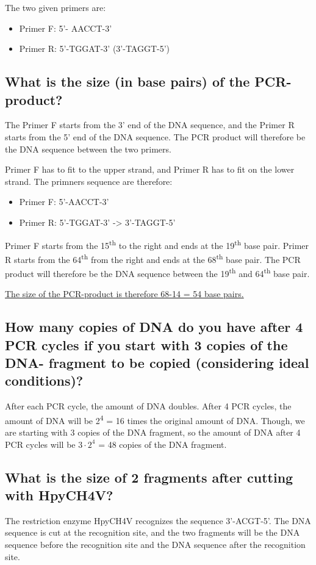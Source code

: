 The two given primers are:
\begin{itemize}
    \item Primer F: 5’- AACCT-3’
    \item Primer R: 5’-TGGAT-3’ (3'-TAGGT-5')
\end{itemize}

\subsection{What is the size (in base pairs) of the PCR-product?}
The Primer F starts from the 3' end of the DNA sequence, and the Primer R starts from the 5' end of the DNA sequence. The PCR product will therefore be the DNA sequence between the two primers.

Primer F has to fit to the upper strand, and Primer R has to fit on the lower strand. The primners sequence are therefore:
\begin{itemize}
    \item Primer F: 5'-AACCT-3' 
    \item Primer R: 5'-TGGAT-3' -> 3'-TAGGT-5'
\end{itemize}

Primer F starts from the 15\textsuperscript{th} to the right and ends at the 19\textsuperscript{th} base pair. Primer R starts from the 64\textsuperscript{th} from the right and ends at the 68\textsuperscript{th} base pair. The PCR product will therefore be the DNA sequence between the 19\textsuperscript{th} and 64\textsuperscript{th} base pair.

\underline{The size of the PCR-product is therefore 68-14 = 54 base pairs.}

\subsection{How many copies of DNA do you have after 4 PCR cycles if you start with 3 copies of the DNA- fragment to be copied (considering ideal conditions)?}
After each PCR cycle, the amount of DNA doubles. After 4 PCR cycles, the amount of DNA will be 2\textsuperscript{4} = 16 times the original amount of DNA.
Though, we are starting with 3 copies of the DNA fragment, so the amount of DNA after 4 PCR cycles will be $3 \cdot 2^4$ = 48 copies of the DNA fragment.

\subsection{What is the size of 2 fragments after cutting with HpyCH4V?}
The restriction enzyme HpyCH4V recognizes the sequence 3'-ACGT-5'. The DNA sequence is cut at the recognition site, and the two fragments will be the DNA sequence before the recognition site and the DNA sequence after the recognition site.


